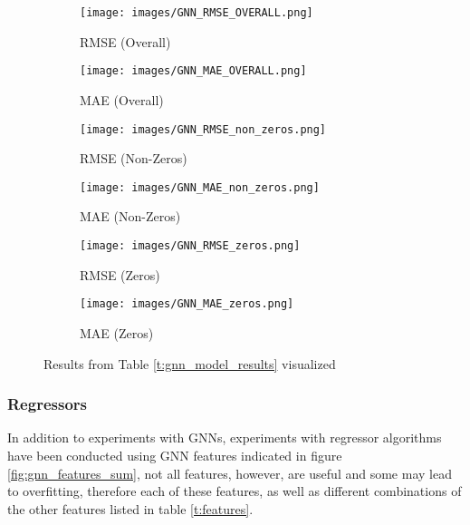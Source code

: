 \documentclass{article}
\begin{document}
\begin{figure}[H]
    \centering
    \begin{subfigure}[b]{0.45\textwidth}
        \texttt{[image: images/GNN\_RMSE\_OVERALL.png]}
        \caption{RMSE (Overall)}
    \end{subfigure}
    \hfill
    \begin{subfigure}[b]{0.45\textwidth}
        \texttt{[image: images/GNN\_MAE\_OVERALL.png]}
        \caption{MAE (Overall)}
    \end{subfigure}

    \vspace{0.5cm}
    \begin{subfigure}[b]{0.45\textwidth}
        \texttt{[image: images/GNN\_RMSE\_non\_zeros.png]}
        \caption{RMSE (Non-Zeros)}
    \end{subfigure}
    \hfill
    \begin{subfigure}[b]{0.45\textwidth}
        \texttt{[image: images/GNN\_MAE\_non\_zeros.png]}
        \caption{MAE (Non-Zeros)}
    \end{subfigure}

    \vspace{0.5cm}
    \begin{subfigure}[b]{0.4\textwidth}
        \texttt{[image: images/GNN\_RMSE\_zeros.png]}
        \caption{RMSE (Zeros)}
    \end{subfigure}
    \hfill
    \begin{subfigure}[b]{0.4\textwidth}
        \texttt{[image: images/GNN\_MAE\_zeros.png]}
        \caption{MAE (Zeros)}
    \end{subfigure}
    
    \caption{Results from Table \ref{t:gnn_model_results} visualized}
    \label{fig:gnn_model_results}
\end{figure}

\subsubsection{Regressors}

In addition to experiments with GNNs, experiments with regressor algorithms have been conducted using GNN features indicated in figure \ref{fig:gnn_features_sum}, not all features, however, are useful and some may lead to overfitting, therefore each of these features, as well as different combinations of the other features listed in table \ref{t:features}.
\end{document}

